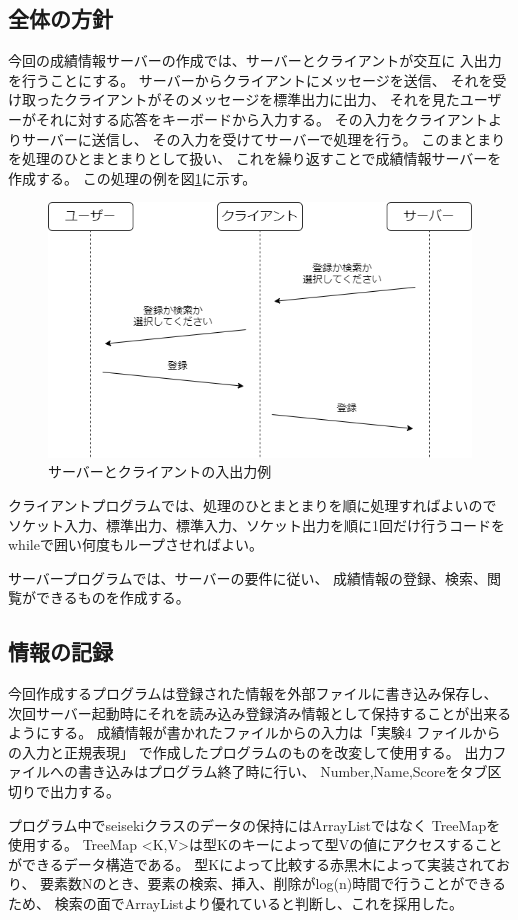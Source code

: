 \documentclass[dvipdfmx]{jsarticle}
\begin{document}
\subsection{全体の方針}
今回の成績情報サーバーの作成では、サーバーとクライアントが交互に
入出力を行うことにする。
サーバーからクライアントにメッセージを送信、
それを受け取ったクライアントがそのメッセージを標準出力に出力、
それを見たユーザーがそれに対する応答をキーボードから入力する。
その入力をクライアントよりサーバーに送信し、
その入力を受けてサーバーで処理を行う。
このまとまりを処理のひとまとまりとして扱い、
これを繰り返すことで成績情報サーバーを作成する。
この処理の例を図\ref{example1}に示す。
\begin{figure}[H]
  \centering
  \includegraphics[width=0.7\hsize]{../pic/1.png}
  \caption{サーバーとクライアントの入出力例}
  \label{example1}
\end{figure}

クライアントプログラムでは、処理のひとまとまりを順に処理すればよいので
ソケット入力、標準出力、標準入力、ソケット出力を順に1回だけ行うコードを
whileで囲い何度もループさせればよい。

サーバープログラムでは、サーバーの要件に従い、
成績情報の登録、検索、閲覧ができるものを作成する。

\subsection{情報の記録}
今回作成するプログラムは登録された情報を外部ファイルに書き込み保存し、
次回サーバー起動時にそれを読み込み登録済み情報として保持することが出来るようにする。
成績情報が書かれたファイルからの入力は「実験4 ファイルからの入力と正規表現」
で作成したプログラムのものを改変して使用する。
出力ファイルへの書き込みはプログラム終了時に行い、
Number,Name,Scoreをタブ区切りで出力する。

プログラム中でseisekiクラスのデータの保持にはArrayListではなく
TreeMapを使用する。
TreeMap \textless K,V\textgreater は型Kのキーによって型Vの値にアクセスすることができるデータ構造である。
型Kによって比較する赤黒木によって実装されており、
要素数Nのとき、要素の検索、挿入、削除がlog(n)時間で行うことができるため、
検索の面でArrayListより優れていると判断し、これを採用した。
\end{document}
